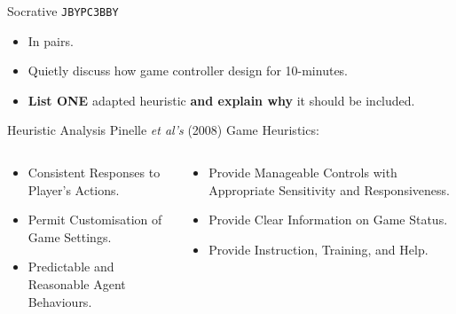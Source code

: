 \begin{frame}[fragile]{Socrative \texttt{JBYPC3BBY}}
	\begin{itemize}
		\item In pairs.
		\item Quietly discuss how game controller design for 10-minutes.
		\item \textbf{List ONE} adapted heuristic \textbf{and explain why} it should be included.
	\end{itemize}
\end{frame}

\begin{frame}{Heuristic Analysis}
Pinelle \textit{et al's} (2008) Game Heuristics:

	\begin{columns}[onlytextwidth]
		\begin{column}{0.45\textwidth}
			\begin{itemize}
				\item Consistent Responses to Player's Actions.
				\item Permit Customisation of Game Settings.
				\item Predictable and Reasonable Agent Behaviours.
			\end{itemize}
		\end{column}
		\begin{column}{0.45\textwidth}				
			\begin{itemize}
				\item Provide Manageable Controls with Appropriate Sensitivity and Responsiveness.
				\item Provide Clear Information on Game Status.
				\item Provide Instruction, Training, and Help.
			\end{itemize}
		\end{column}
	\end{columns}
\end{frame}


